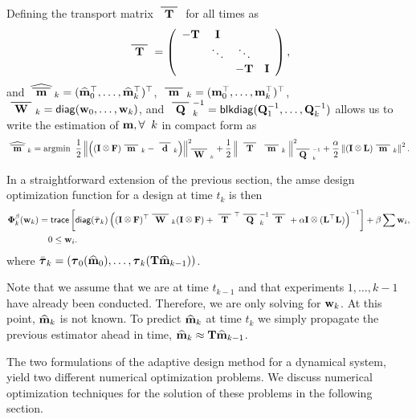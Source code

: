 \documentclass[11pt]{article}
\begin{document}
Defining the transport matrix $\Tbar$ for all times as
\begin{equation*}
\Tbar = \left( \begin{array}{cccc} -\bfT & \bfI &   \\  & \ddots & \ddots\\ & &   -\bfT & \bfI  \end{array}\right),
\end{equation*}
and  $\widehat{\mbar}_k = (\bfmhat_0^{\top}, \hdots, \bfmhat_k^{\top})^{\top}$, $\mbar_k = (\bfm_0^{\top}, \hdots, \bfm_k^{\top})^{\top}$, $\Wbar_k = {\sf diag}(\bfw_0,\hdots,\bfw_k)$, and $ \Qbar^{-1}_k = {\sf blkdiag}(\bfQ^{-1}_1,\hdots,\bfQ^{-1}_k)$  
allows us to write the estimation of  ${\bf{m}}, \forall \;\; k$ in compact form as
\begin{equation}
\label{noisymk}
\widehat{\mbar}_k = {\rm argmin } \;\;\hf \left\| \left((\bfI \kronecker \bfF)\mbar_k - \dbar_k\right)\right\|^2_{\Wbar_k} + \hf\left\|
\;\Tbar\;\mbar_k
\;\right\|^2_{\Qbar^{-1}_k} + {\frac \alpha 2} \left\| (\bfI \kronecker \bfL)\mbar_k \right\|^{2}.
\end{equation} 

In a straightforward extension of the previous section, 
the amse design optimization function for a design at time $t_k$ is then
\begin{align}
\label{eq:noiselessOpt}
\nonumber
\bfPhi^{\beta}_k(\bfw_k) =
&\;{\sf trace}\left[ {\sf diag}(\bar{\bftau}_{k}) \left((\bfI \kronecker \bfF)^{\top}\Wbar_k(\bfI \kronecker \bfF)  +
\Tbar^{\top}\Qbar^{-1}_k\Tbar + \alpha \bfI \kronecker(\LtL)
\right)^{-1}\right] + \beta \sum \bfw_i,  \\
 &0 \leq \bfw_i.
\end{align}
where $\bar{{\boldsymbol \tau}}_{k} = \left({\boldsymbol \tau}_0({\widehat{{\bf{m}}}}_0), \hdots, {\boldsymbol \tau}_k({\bf{T}}{\widehat{{\bf{m}}}}_{k-1})\right)$. 

Note that we assume that we are at time $t_{k-1}$ and that experiments $1,\ldots,k-1$ have already been conducted.
Therefore, we are only solving for ${\bf{w}}_k$. At this point,  ${\widehat{{\bf{m}}}}_k$ is not known. 
To predict ${\widehat{{\bf{m}}}}_k$ at time $t_k$ we simply propagate the previous estimator ahead in time, ${\widehat{{\bf{m}}}}_k \approx {\bf{T}}{\widehat{{\bf{m}}}}_{k-1}$. 

\bigskip

The two formulations of the adaptive design method for a dynamical system, yield two different numerical optimization problems. We discuss numerical optimization techniques for the solution of these problems in the following section.
\end{document}
